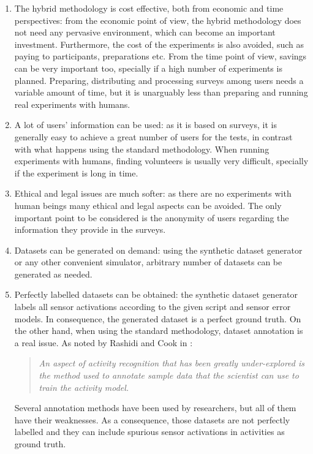 \begin{enumerate}
 \item The hybrid methodology is cost effective, both from economic and time perspectives: from the economic point of view, the hybrid methodology does not need any pervasive environment, which can become an important investment. Furthermore, the cost of the experiments is also avoided, such as paying to participants, preparations etc. From the time point of view, savings can be very important too, specially if a high number of experiments is planned. Preparing, distributing and processing surveys among users needs a variable amount of time, but it is unarguably less than preparing and running real experiments with humans. 
 \item A lot of users' information can be used: as it is based on surveys, it is generally easy to achieve a great number of users for the tests, in contrast with what happens using the standard methodology. When running experiments with humans, finding volunteers is usually very difficult, specially if the experiment is long in time. 
 \item Ethical and legal issues are much softer: as there are no experiments with human beings many ethical and legal aspects can be avoided. The only important point to be considered is the anonymity of users regarding the information they provide in the surveys.
 \item Datasets can be generated on demand: using the synthetic dataset generator or any other convenient simulator, arbitrary number of datasets can be generated as needed.
 \item Perfectly labelled datasets can be obtained: the synthetic dataset generator labels all sensor activations according to the given script and sensor error models. In consequence, the generated dataset is a perfect ground truth. On the other hand, when using the standard methodology, dataset annotation is a real issue. As noted by Rashidi and Cook in \cite{Rashidi2011}: \blockquote{\textit{An aspect of activity recognition that has been greatly under-explored is the method used to annotate sample data that the scientist can use to train the activity model.}} Several annotation methods have been used by researchers, but all of them have their weaknesses. As a consequence, those datasets are not perfectly labelled and they can include spurious sensor activations in activities as ground truth.

\end{enumerate}
